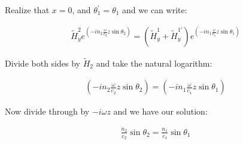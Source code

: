 \documentclass{article}
\begin{document}
Realize that $x = 0$, and $\theta_{1}^{'} = \theta_{1}$ and we can write:

\begin{align}
\tilde{H}_{y}^{2} e^{\left( -i n_{2} \frac{\omega}{c_2} z \sin{\theta}_{2}
\right)}  = \left(\tilde{H}_{y}^{1} + \tilde{H}_{y}^{1'} \right) e^{\left( -i n_{1} \frac{\omega}{c_1} z \sin{\theta}_{1}
\right)} 
\end{align}

Divide both sides by $\tilde{H}_{2}$ and take the natural logarithm:

\begin{align}
\left( -i n_{2} \frac{\omega}{c_2} z \sin{\theta}_{2}
\right)  =  \left( -i n_{1} \frac{\omega}{c_1} z \sin{\theta}_{1}
\right) 
\end{align}

Now divide through by $-i \omega z$ and we have our solution:

\begin{align}
\frac{n_2}{c_2} \sin{\theta}_{2} = \frac{n_1}{c_1} \sin{\theta}_{1}
\end{align}
\end{document}

